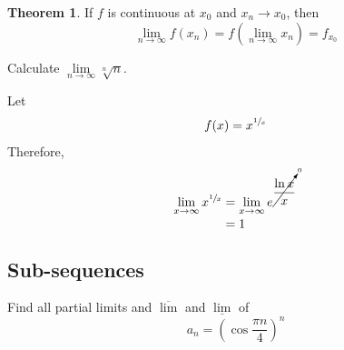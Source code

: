 \documentclass[fleqn, a4paper, 12pt, twoside]{article}
\theoremstyle{definition}
\theoremstyle{theorem}
\newtheorem{theorem}{Theorem}
\begin{document}
\begin{theorem}
	If $f$ is continuous at $x_0$ and $x_n \to x_0$, then 
	\begin{equation*}
		\lim\limits_{n \to \infty} f(x_n) = f\left( \lim\limits_{n \to \infty} x_n \right) = f_{x_0}
	\end{equation*}
\end{theorem}

\begin{question}
	Calculate $\lim\limits_{n \to \infty} \sqrt[n]{n}$.
\end{question}

\begin{solution}
	Let
	\begin{equation*}
		f(x) = x^{\sfrac{1}{x}}
	\end{equation*}
	Therefore,
	\begin{align*}
		\lim\limits_{x \to \infty} x^{\sfrac{1}{x}} &= \lim\limits_{x \to \infty} e^{\cancelto{0}{\dfrac{\ln x}{x}}}\\
		&= 1
	\end{align*}
\end{solution}

\subsection{Sub-sequences}

\begin{question}
	Find all partial limits and $\overline{\lim}$ and $\underline{\lim}$ of
	\begin{equation*}
		a_n = \left( \cos \dfrac{\pi n}{4} \right)^n
	\end{equation*}
\end{question}
\end{document}
